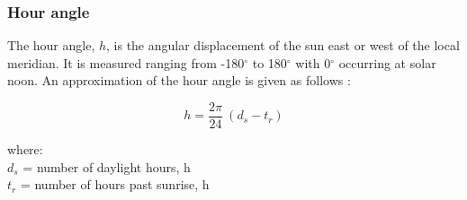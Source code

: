 \subsubsection{Hour angle}
\label{sec:hour}
The hour angle, $h$, is the angular displacement of the sun east or west of the local meridian. 
It is measured ranging from -180$^{\circ}$ to 180$^{\circ}$ with 0$^{\circ}$ occurring at solar noon. 
An approximation of the hour angle is given as follows \parencite{cooper69}:

\begin{equation}
\label{eq:houra}
    h = \frac{2\pi}{24} \: (d_{s} - t_r)
\end{equation}

\noindent where: \\
\indent $d_s$ = number of daylight hours, h \\
\indent $t_r$ = number of hours past sunrise, h\\

